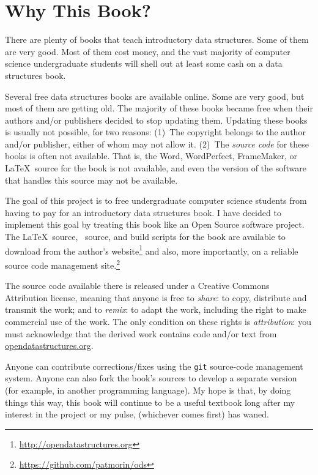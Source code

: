 \chapter*{Why This Book?}

There are plenty of books that teach introductory data structures.
Some of them are very good.  Most of them cost money, and the vast
majority of computer science undergraduate students will shell out at
least some cash on a data structures book.

Several free data structures books are available online.  Some are very
good, but most of them are getting old.  The majority of these books
became free when their authors and/or publishers decided to stop updating
them.  Updating these books is usually not possible, for two reasons:
(1)~The copyright belongs to the author and/or publisher, either of whom
may not allow it.  (2)~The \emph{source code} for these books is often
not available.  That is, the Word, WordPerfect, FrameMaker, or \LaTeX\
source for the book is not available, and even the version of the software
that handles this source may not be available.

The goal of this project is to free undergraduate computer science
students from having to pay for an introductory data structures book.
I have decided to implement this goal by treating this book like an
Open Source
software project.  The \LaTeX\ source, \lang\ source, and
build scripts for the book are available to download from the
author's website\footnote{\url{http://opendatastructures.org}}
and also, more importantly, on a reliable source code management
site.\footnote{\url{https://github.com/patmorin/ods}}

The source code available there is released under a Creative Commons
Attribution license, meaning that anyone is free to \emph{share}:
\index{share}
to copy, distribute and
transmit the work; and to \emph{remix}:
to adapt the work, including the
right to make commercial use of the work.  The only condition on these
rights is \emph{attribution}: you must acknowledge that the derived work
contains code and/or text from \url{opendatastructures.org}.

Anyone can contribute corrections/fixes using the \texttt{git}
source-code management system.  Anyone can also fork the book's sources to
develop a separate version (for example, in another programming language).
My hope is that, by doing things this way, this book will continue to
be a useful textbook long after my interest in the project or my pulse,
(whichever comes first) has waned.


